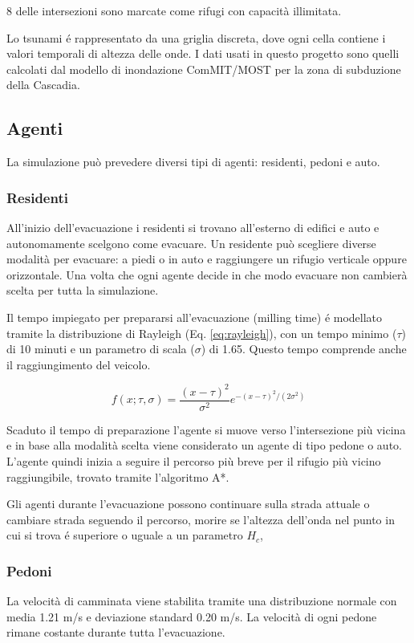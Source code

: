 8 delle intersezioni sono marcate come rifugi con capacità illimitata.

Lo tsunami é rappresentato da una griglia discreta, dove ogni cella contiene i valori temporali di altezza delle onde.
I dati usati in questo progetto sono quelli calcolati dal modello di inondazione ComMIT/MOST \cite{titov1997implementation} per la zona di subduzione della Cascadia.


\subsection{Agenti}
La simulazione può prevedere diversi tipi di agenti: residenti, pedoni e auto.

\subsubsection{Residenti}
All'inizio dell'evacuazione i residenti si trovano all'esterno di edifici e auto
e autonomamente scelgono come evacuare. %
Un residente può scegliere diverse modalità per evacuare: a piedi o in auto e raggiungere un rifugio verticale oppure orizzontale.
Una volta che ogni agente decide in che modo evacuare non cambierà scelta per tutta la simulazione.

\vspace*{4mm}
Il tempo impiegato per prepararsi all'evacuazione (milling time) é modellato tramite
la distribuzione di Rayleigh (Eq. \ref{eq:rayleigh}), con un tempo minimo ($\tau$) di 10 minuti
e un parametro di scala ($\sigma$) di 1.65.
Questo tempo comprende anche il raggiungimento del veicolo.

\begin{equation}
  f(x; \tau, \sigma) = \frac{(x - \tau)^2}{\sigma^2}e^{-{(x - \tau)^2}/(2\sigma^2)}
  \label{eq:rayleigh}
\end{equation}

Scaduto il tempo di preparazione l'agente si muove verso l'intersezione più vicina e
in base alla modalità scelta viene considerato un agente di tipo pedone o auto.
L'agente quindi inizia a seguire il percorso più breve per il rifugio più vicino raggiungibile, trovato tramite l'algoritmo A*.

Gli agenti durante l'evacuazione possono continuare sulla strada attuale o cambiare strada seguendo il percorso,
morire se l'altezza dell'onda nel punto in cui si trova é superiore o uguale a un parametro $H_c$,

\subsubsection{Pedoni}
La velocità di camminata viene stabilita tramite una distribuzione normale
con media 1.21 m/s e deviazione standard 0.20 m/s.
La velocità di ogni pedone rimane costante durante tutta l'evacuazione.

